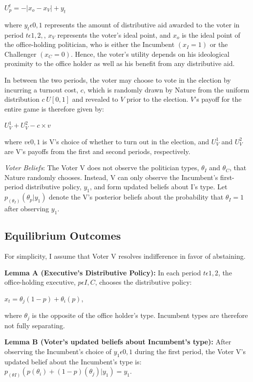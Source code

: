 \documentclass[12pt]{paper}
\begin{document}
$U_{p}^t = -|x_o - x_V| + y_t$

where $y_t\epsilon{0,1}$ represents the amount of distributive aid awarded to the voter in period $t\epsilon{1,2},$, $x_V$ represents the voter’s ideal point, and $x_o$ is the ideal point of the office-holding politician, who is either the Incumbent $(x_I=1)$ or the Challenger $(x_C=0).$ Hence, the voter’s utility depends on his ideological proximity to the office holder as well as his benefit from any distributive aid.

In between the two periods, the voter may choose to vote in the election by incurring a turnout cost, $c$, which is randomly drawn by Nature from the uniform distribution $c~U[0,1]$ and revealed to $V$ prior to the election. $V$’s payoff for the entire game is therefore given by:

$U_{V}^1 + U_{V}^2 - c \times v$

where $v\epsilon{0,1}$ is V’s choice of whether to turn out in the election, and $U_{V}^1$ and $U_{V}^2$ are V’s payoffs from the first and second periods, respectively.

\emph{Voter Beliefs}: The Voter V does not observe the politician types, $\theta_I$ and $\theta_C$, that Nature randomly chooses. Instead, V can only observe the Incumbent's first-period distributive policy,  $y_1$, and form updated beliefs about I’s type. Let $p_(\theta_I ) (\theta_p | y_1 )$ denote the V’s posterior beliefs about the probability that $\theta_I=1$ after observing $y_1$.

\subsection{Equilibrium Outcomes}
	For simplicity, I assume that Voter V resolves indifference in favor of abstaining.
	
\textbf{Lemma A (Executive’s Distributive Policy):} In each period $t\epsilon{1,2}$, the office-holding executive, $p\epsilon{I,C}$, chooses the distributive policy: 

$x_t=\theta_j (1-p)+ \theta_i (p)$, 

where $\theta_j$ is the opposite of the office holder’s type. Incumbent types are therefore not fully separating. 


\textbf{Lemma B (Voter’s updated beliefs about Incumbent’s type):}  After observing the Incumbent’s choice of $y_1 \epsilon {0,1}$ during the first period, the Voter V’s updated belief about the Incumbent’s type is: $p_(\theta I) (p(\theta_i ) + (1 - p)(\theta_j ) | y_1 )=y_1$.
\end{document}
